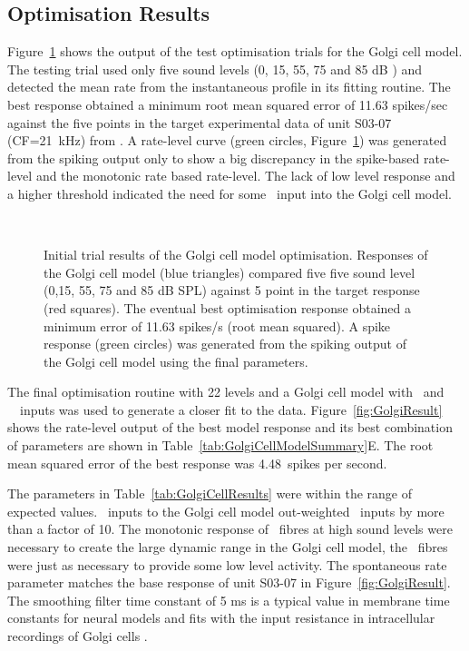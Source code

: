 \subsection{Optimisation Results}

Figure~\ref{fig:GolgiTestResult} shows the output of the test optimisation trials for the Golgi cell model.
The testing trial used only five sound levels (0, 15, 55, 75 and 85 dB \SPL) and detected the mean rate from the instantaneous profile in its fitting routine.
The best response obtained a minimum root mean squared error of 11.63 spikes/sec against the five points in the target experimental data of unit S03-07 (CF=21~kHz) from \citep{GhoshalKim:1996}.
A rate-level curve (green circles, Figure~\ref{fig:GolgiTestResult}) was generated from the spiking output only to show a big discrepancy in the spike-based rate-level and the monotonic rate based rate-level.
The lack of low level response and a higher threshold indicated the need for some \HSR~input into the Golgi cell model.



\begin{figure}[htb]
  \centering
{}\\
  \caption[Initial results of Golgi cell model]{Initial trial results of the Golgi cell model optimisation.
Responses of the Golgi cell model (blue triangles) compared five five sound level (0,15, 55, 75 and 85 dB SPL) against 5 point in the target response (red squares).
The eventual best optimisation response obtained a minimum error of 11.63 spikes/s (root mean squared).
A spike response (green circles) was generated from the spiking output of the Golgi cell model using the final parameters. \label{fig:GolgiTestResult}}
\end{figure}

The final optimisation routine with 22 levels and a Golgi cell model with \HSR~and \LSR~\ANF~inputs was used to generate a closer fit to the \citeauthor{GhoshalKim:1996}  data.
Figure~\ref{fig:GolgiResult} shows the rate-level output of the best model response and its best combination of parameters are shown in Table~\ref{tab:GolgiCellModelSummary}E.
The root mean squared error of the best response was 4.48~spikes per second.

The parameters in Table~\ref{tab:GolgiCellResults} were within the range of expected values.
\LSR~inputs to the Golgi cell model out-weighted \HSR~inputs by more than a factor of 10.
The monotonic response of \LSR~fibres at high sound levels were necessary to create the large dynamic range in the Golgi cell model, the \HSR~fibres were just as necessary to provide some low level activity.
The spontaneous rate parameter matches the base response of unit S03-07 in Figure~\ref{fig:GolgiResult}.
The smoothing filter time constant of 5 ms is a typical value in membrane time constants for neural models and fits with the input resistance in intracellular recordings of Golgi cells \citep{FerragamoGoldingEtAl:1998}.

